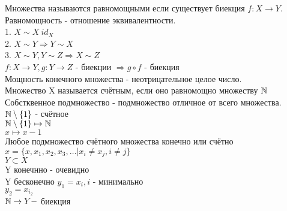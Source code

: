 Множества называются равномощными если существует биекция $ f: X \rightarrow Y $. Равномощность - отношение эквивалентности.\\
1. $X \sim X \ id_X$ \\
2. $ X \sim Y \Rightarrow Y \sim X$ \\ 
3. $ X \sim Y, Y \sim Z \Rightarrow X \sim Z $ \\
$ f: X \rightarrow Y, g: Y \rightarrow Z $ - биекции $\Rightarrow g \circ f $ - биекция \\
Мощность конечного множества - неотрицательное целое число. \\
Множество X называется счётным, если оно равномощно множеству $ \mathbb{N} $\\
Собстквенное подмножество - подмножество отличное от всего множества. \\
$ \mathbb{N} \setminus \{1\} $ - счётное \\
$ \mathbb{N} \setminus \{1\} \mapsto \mathbb{N} $\\
$ x \mapsto x - 1 $ \\
Любое подмножество счётного множества конечно или счётно \\
$ x = \{ x, x_1, x_2, x_3, \dots | x_i \neq x_j, i \neq j \}$ \\
$ Y \subset X $ \\
Y конечнно - очевидно \\
Y бесконечно $ y_1 = x_i, i $ - минимально \\
$ y_2 = x_{i_2}  $\\
$ \mathbb{N} \rightarrow Y - $ биекция

